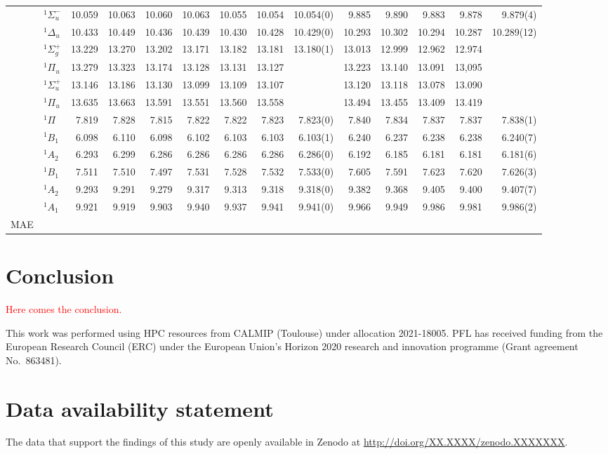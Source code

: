 \documentclass[aip,jcp,reprint,noshowkeys,superscriptaddress]{revtex4-1}
\newcommand{\titou}[1]{\textcolor{red}{#1}}
\begin{document}
\begin{squeezetable}
\begin{table*}
\begin{ruledtabular}
\begin{tabular}{llrrrrrrrrrrrr}
				&	$^1\Sigma_u^-$	&10.059	&10.063	&10.060	&10.063	&10.055	&10.054	&10.054(0)	&9.885	&9.890	&9.883	&9.878	&	9.879(4)\\
				&	$^1\Delta_u$ 	&10.433	&10.449	&10.436	&10.439	&10.430	&10.428	&10.429(0)	&10.293	&10.302	&10.294	&10.287	&	10.289(12)\\
				&	$^1\Sigma_g^+$	&13.229	&13.270	&13.202	&13.171	&13.182	&13.181	&13.180(1)	&13.013	&12.999	&12.962	&12.974	&	\\
				&	$^1\Pi_u$  		&13.279	&13.323	&13.174	&13.128	&13.131	&13.127	&			&13.223	&13.140	&13.091	&13,095	&	\\
				&	$^1\Sigma_u^+$	&13.146	&13.186	&13.130	&13.099	&13.109	&13.107	&			&13.120	&13.118	&13.078	&13.090	&	\\
				&	$^1\Pi_u$ 		&13.635	&13.663	&13.591	&13.551	&13.560	&13.558	&			&13.494	&13.455	&13.409	&13.419\\
	\ce{HCl}	&	$^1\Pi$ 		&7.819	&7.828	&7.815	&7.822	&7.822	&7.823	&7.823(0)	&7.840	&7.834	&7.837	&7.837	&7.838(1)\\
	\ce{H2S}	&	$^1B_1$  		&6.098	&6.110	&6.098	&6.102	&6.103	&6.103	&6.103(1)	&6.240	&6.237	&6.238	&6.238	&6.240(7)\\
				&	$^1A_2$  		&6.293	&6.299	&6.286	&6.286	&6.286	&6.286	&6.286(0)	&6.192	&6.185	&6.181	&6.181	&6.181(6) \\
	\ce{H2O}	&	$^1B_1$  		&7.511	&7.510	&7.497	&7.531	&7.528	&7.532	&7.533(0)	&7.605	&7.591	&7.623	&7.620	&7.626(3)\\
				&	$^1A_2$  		&9.293	&9.291	&9.279	&9.317	&9.313	&9.318	&9.318(0)	&9.382	&9.368	&9.405	&9.400	&9.407(7)\\
				&	$^1A_1$  		&9.921	&9.919	&9.903	&9.940	&9.937	&9.941	&9.941(0)	&9.966	&9.949	&9.986	&9.981	&9.986(2)\\
	\hline
	MAE			&					&	\\
	\end{tabular}
	\end{ruledtabular}
\end{table*}
\end{squeezetable}

\section{Conclusion}

\titou{Here comes the conclusion.}

\begin{acknowledgements}
This work was performed using HPC resources from CALMIP (Toulouse) under allocation 2021-18005.
PFL has received funding from the European Research Council (ERC) under the European Union's Horizon 2020 research and innovation programme (Grant agreement No.~863481).
\end{acknowledgements}

\section*{Data availability statement}
The data that support the findings of this study are openly available in Zenodo at \href{http://doi.org/XX.XXXX/zenodo.XXXXXXX}{http://doi.org/XX.XXXX/zenodo.XXXXXXX}.


\end{document}
